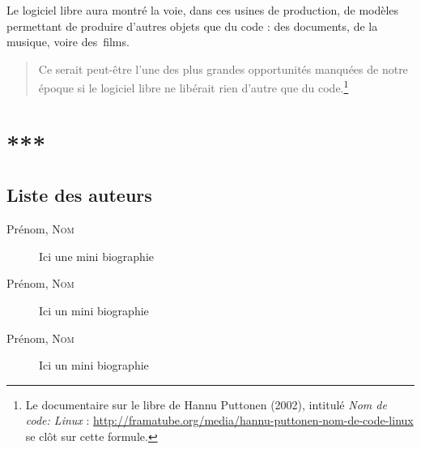 \documentclass{FramateX}
\begin{document}
\begin{refsection}
Le logiciel libre aura montré la voie, dans ces usines de production, de
modèles permettant de produire d'autres objets que du code : des
documents, de la musique, voire des~films. 

\begin{quote}
Ce serait peut-être l'une des plus grandes opportunités
manquées de notre époque si le logiciel libre ne libérait rien d'autre
que du code.\footnote{Le documentaire sur le libre de Hannu
Puttonen (2002), intitulé \textit{Nom de code: Linux} :
\url{http://framatube.org/media/hannu-puttonen-nom-de-code-linux} se
clôt sur cette formule.}
\end{quote}

\nocite{aigraincadre2002,deroyaspects2007,elieeconomie2009,goshguideline2005,guedjtheoreme2000,langinternet2000,lebarsmodeeconomique2003,parmentierles2007}


\printbibliography[heading=subbibliography]
\end{refsection}                        
%

%
 \part*{***}
{}

\chapter*{Liste des auteurs}
{}



\begin{description}

\item[Prénom, \textsc{Nom}]
Ici une mini biographie
\item[Prénom, \textsc{Nom}]
Ici un mini biographie
\item[Prénom, \textsc{Nom}]
Ici un mini biographie


\end{description}


\backmatter

{}
{}


\newpage                    


\end{document}
